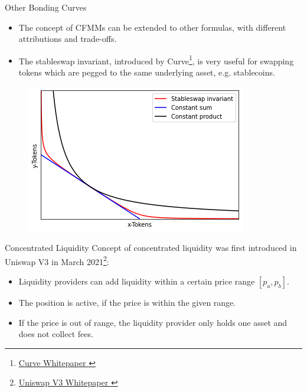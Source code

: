 \documentclass[]{beamer}
\begin{document}
\begin{frame}{Other Bonding Curves}

\begin{small}
\begin{itemize}
	\item The concept of CFMMs can be extended to other formulas, with different attributions and trade-offs. 
	\item The stableswap invariant, introduced by Curve\footnote{\href{https://curve.fi/files/stableswap-paper.pdf}{Curve Whitepaper \link}}, is very useful for swapping tokens which are pegged to the same underlying asset, e.g. stablecoins.
	\end{itemize}
\end{small}

	\begin{figure}
		\includegraphics[scale=0.6]{../assets/images/bonding-curves.png}
	\end{figure}
	
\end{frame}


\begin{frame}{Concentrated Liquidity}
	Concept of concentrated liquidity was first introduced in Uniswap V3 in March 2021\footnote{\href{https://uniswap.org/whitepaper-v3.pdf}{Uniswap V3 Whitepaper \link}}:
	\begin{itemize}
		\item<2-> Liquidity providers can add liquidity within a certain price range $[p_a, p_b]$.
		\item<3-> The position is active, if the price is within the given range.
		\item<4-> If the price is out of range, the liquidity provider only holds one asset and does not collect fees.
	\end{itemize}
	\vspace{0.5cm}
\end{frame}
\end{document}
